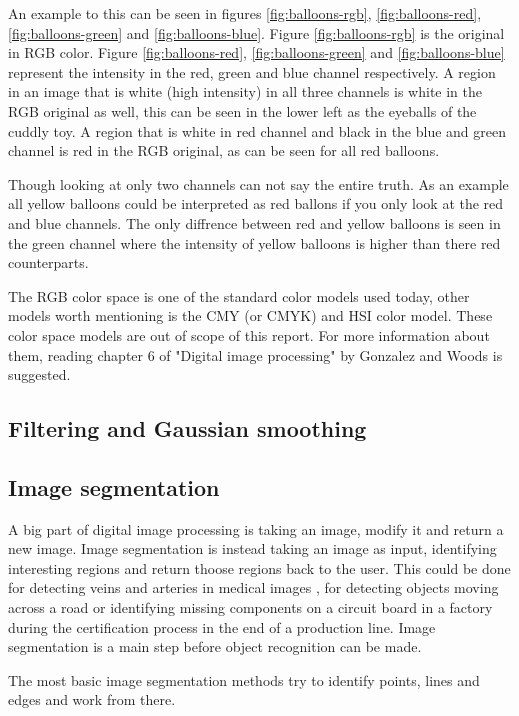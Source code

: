 An example to this can be seen in figures \ref{fig:balloons-rgb},
\ref{fig:balloons-red}, \ref{fig:balloons-green} and \ref{fig:balloons-blue}.
Figure \ref{fig:balloons-rgb} is the original in RGB color. Figure \ref{fig:balloons-red},
\ref{fig:balloons-green} and \ref{fig:balloons-blue} represent the intensity in the red,
green and blue channel respectively. A region in an image that is white (high
intensity) in all three channels is white in the RGB original as well, this can
be seen in the lower left as the eyeballs of the cuddly toy. A region that is white
in red channel and black in the blue and green channel is red in the RGB original, as
can be seen for all red balloons.

Though looking at only two channels can not say the entire truth. As an example all
yellow balloons could be interpreted as red ballons if you only look at the
red and blue channels. The only diffrence between red and yellow balloons is
seen in the green channel where the intensity of yellow balloons is higher than
there red counterparts.

The RGB color space is one of the standard color models used today, other models
worth mentioning is the CMY (or CMYK) and HSI color model. These color space
models are out of scope of this report. For more information about them,
reading chapter 6 of "Digital image processing" by Gonzalez and Woods \cite{gonzalez2008} is suggested.

\subsection{Filtering and Gaussian smoothing}

\subsection{Image segmentation}
A big part of digital image processing is taking an image, modify it and
return a new image. Image segmentation is instead taking an image as input,
identifying interesting regions and return thoose regions back to the user.
This could be done for detecting veins and arteries in medical images \cite{olena2010},
for detecting objects moving across a road or identifying missing components on
a circuit board in a factory during the certification process in the end of a production line.
Image segmentation is a main step before object recognition can be made.

The most basic image segmentation methods try to identify points, lines and edges
and work from there.

